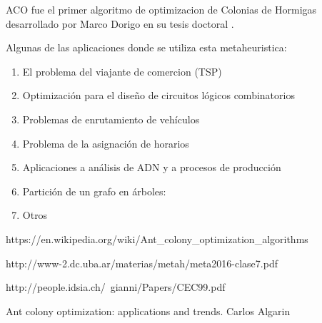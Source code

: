 ACO fue el primer algoritmo de optimizacion de Colonias de Hormigas desarrollado por Marco Dorigo en su tesis doctoral \cite{paperDorigo}. 

Algunas de las aplicaciones donde se utiliza esta metaheuristica:
\begin{enumerate}
\item El problema del viajante de comercion (TSP)
\item Optimización para el diseño de circuitos lógicos combinatorios
\item Problemas de enrutamiento de vehículos
\item Problema de la asignación de horarios
\item Aplicaciones a análisis de ADN y a procesos de producción
\item Partición de un grafo en árboles:
\item Otros
\end{enumerate}



\begin{thebibliography}{9}
https://en.wikipedia.org/wiki/Ant\_colony\_optimization\_algorithms

http://www-2.dc.uba.ar/materias/metah/meta2016-clase7.pdf

 
http://people.idsia.ch/~gianni/Papers/CEC99.pdf

Ant colony optimization: applications and trends. Carlos Algarin

\end{thebibliography}